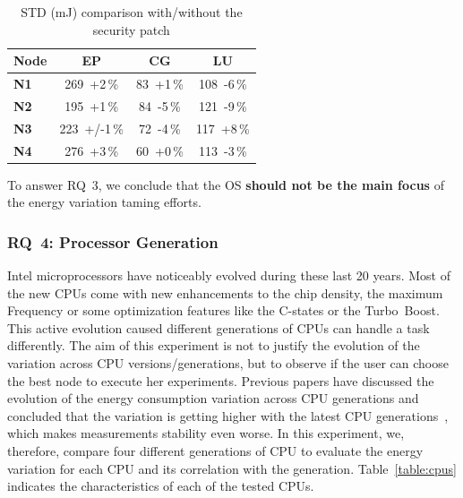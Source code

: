 \begin{table}[h!]
    \centering
    \caption{STD (mJ) comparison with/without the security patch}
    \label{table:meltdown}
    \small
    \begin{tabular}{|l|c|c|c|}
        \hline
        \textbf{Node} & \textbf{\sf EP} & \textbf{\sf CG} & \textbf{\sf LU} \\
        \hline
        \hline
        \textbf{N1}   & 269~+2\,\%      & 83~+1\,\%       & 108~-6\,\%      \\
        \hline
        \textbf{N2}   & 195~+1\,\%      & 84~-5\,\%       & 121~-9\,\%      \\
        \hline
        \textbf{N3}   & 223~+/-1\,\%    & 72~-4\,\%       & 117~+8\,\%      \\
        \hline
        \textbf{N4}   & 276~+3\,\%      & 60~+0\,\%       & 113~-3\,\%      \\
        \hline
    \end{tabular}
\end{table}

\begin{mdframed}[skipabove=\topsep,skipbelow=\topsep]
    To answer \textsc{RQ~3}, we conclude that the OS \textbf{should not be the main focus} of the energy variation taming efforts.
\end{mdframed}

\subsubsection{\textsc{RQ}~4: Processor Generation}
Intel microprocessors have noticeably evolved during these last 20 years.
Most of the new CPUs come with new enhancements to the chip density, the maximum Frequency or some optimization features like the C-states or the Turbo~Boost.
This active evolution caused different generations of CPUs can handle a task differently.
The aim of this experiment is not to justify the evolution of the variation across CPU versions/generations, but to observe if the user can choose the best node to execute her experiments.
Previous papers have discussed the evolution of the energy consumption variation across CPU generations and concluded that the variation is getting higher with the latest CPU generations~\cite{wang_experimental_nodate,marathe_empirical_2017_m}, which makes measurements stability even worse.
In this experiment, we, therefore, compare four different generations of CPU to evaluate the energy variation for each CPU and its correlation with the generation.
Table~\ref{table:cpus} indicates the characteristics of each of the tested CPUs.

